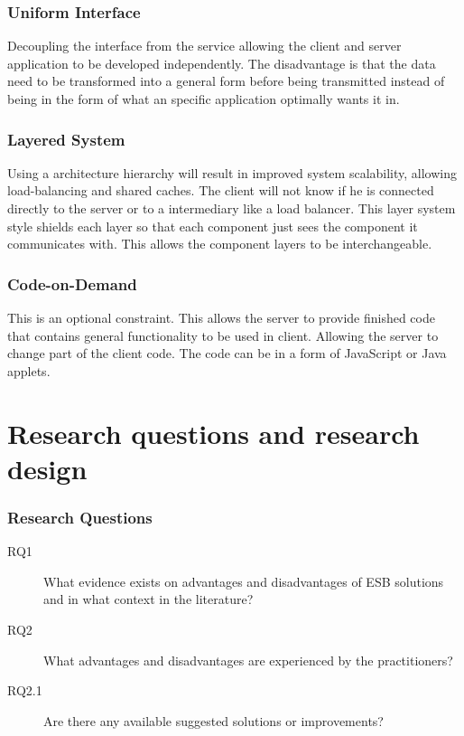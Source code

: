 \documentclass{llncs}
\begin{document}
\subsubsection{Uniform Interface}
Decoupling the interface from the service allowing the client and server application to be developed  independently. The disadvantage is that the data need to be transformed into a general form before being transmitted instead of being in the form of what an specific application optimally wants it in.

\subsubsection{Layered System}
Using a architecture hierarchy will result in improved system scalability, allowing load-balancing and shared caches. The client will not know if he is connected directly to the server or to a intermediary like a load balancer. This layer system style shields each layer so that each component just sees the component it communicates with. This allows the component layers to be interchangeable.

\subsubsection{Code-on-Demand}
This is an optional constraint. This allows the server to provide finished code that contains general functionality to be used in client. Allowing the server to change part of the client code. The code can be in a form of JavaScript or Java applets.


\section{Research questions and research design}
\subsubsection{Research Questions}

\begin{description}
\item[RQ1] What evidence exists on advantages and disadvantages of ESB solutions and in what context in the literature?
\item[RQ2] What advantages and disadvantages are experienced by the practitioners?
\item[RQ2.1] Are there any available suggested solutions or improvements?
\end{description}
\end{document}
